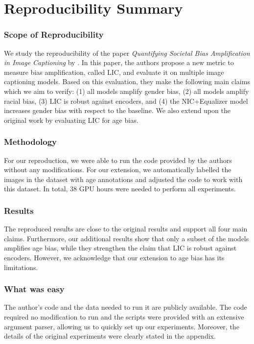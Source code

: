 \section*{\centering Reproducibility Summary}

\subsubsection*{Scope of Reproducibility}
We study the reproducibility of the paper \textit{Quantifying Societal Bias Amplification in Image Captioning} \cite{hirota} by \citeauthor{hirota}. In this paper, the authors propose a new metric to measure bias amplification, called LIC, and evaluate it on multiple image captioning models. Based on this evaluation, they make the following main claims which we aim to verify: (1) all models amplify gender bias, (2) all models amplify racial bias, (3) LIC is robust against encoders, and (4) the NIC+Equalizer model increases gender bias with respect to the baseline. We also extend upon the original work by evaluating LIC for age bias.

\subsubsection*{Methodology}
For our reproduction, we were able to run the code provided by the authors without any modifications. For our extension, we automatically labelled the images in the dataset with age annotations and adjusted the code to work with this dataset. In total, 38 GPU hours were needed to perform all experiments.

\subsubsection*{Results}
The reproduced results are close to the original results and support all four main claims. Furthermore, our additional results show that only a subset of the models amplifies age bias, while they strengthen the claim that LIC is robust against encoders. However, we acknowledge that our extension to age bias has its limitations.

\subsubsection*{What was easy}
The author's code and the data needed to run it are publicly available. The code required no modification to run and the scripts were provided with an extensive argument parser, allowing us to quickly set up our experiments. Moreover, the details of the original experiments were clearly stated in the appendix.

